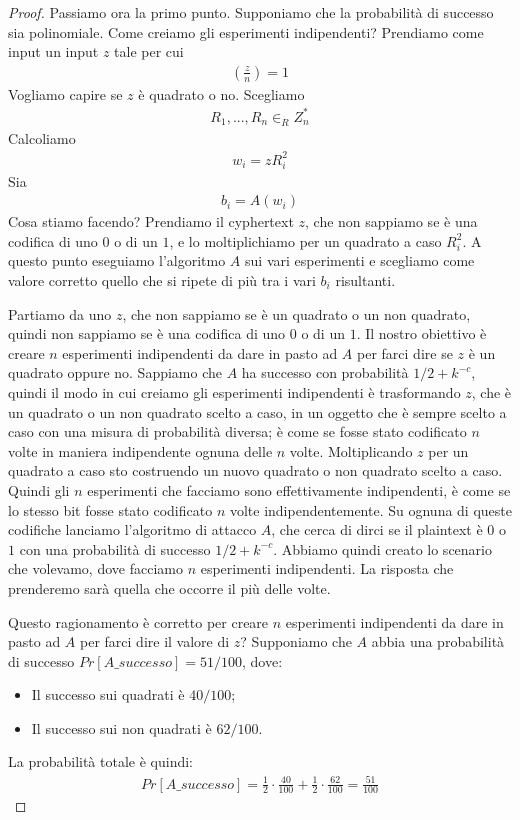 \begin{proof}
\noindent Passiamo ora la primo punto. Supponiamo che la probabilità di successo sia polinomiale. Come creiamo gli esperimenti indipendenti? Prendiamo come input un input $z$ tale per cui
\begin{align*}
    \left( \frac{z}{n}\right) = 1
\end{align*}
\noindent Vogliamo capire se $z$ è quadrato o no. Scegliamo
\begin{align*}
    R_1, ..., R_n \in_R Z_n^*
\end{align*}
\noindent Calcoliamo 
\begin{align*}
    w_i = zR_i^2
\end{align*}
\noindent Sia
\begin{align*}
    b_i = A(w_i)
\end{align*}
\noindent Cosa stiamo facendo? Prendiamo il cyphertext $z$, che non sappiamo se è una codifica di uno $0$ o di un $1$, e lo moltiplichiamo per un quadrato a caso $R_i^2$. A questo punto eseguiamo l'algoritmo $A$ sui vari esperimenti e scegliamo come valore corretto quello che si ripete di più tra i vari $b_i$ risultanti.

Partiamo da uno $z$, che non sappiamo se è un quadrato o un non quadrato, quindi non sappiamo se è una codifica di uno $0$ o di un $1$. Il nostro obiettivo è creare $n$ esperimenti indipendenti da dare in pasto ad $A$ per farci dire se $z$ è un quadrato oppure no. Sappiamo che $A$ ha successo con probabilità $1/2 + k^{-c}$, quindi il modo in cui creiamo gli esperimenti indipendenti è trasformando $z$, che è un quadrato o un non quadrato scelto a caso, in un oggetto che è sempre scelto a caso con una misura di probabilità diversa; è come se fosse stato codificato $n$ volte in maniera indipendente ognuna delle $n$ volte. Moltiplicando $z$ per un quadrato a caso sto costruendo un nuovo quadrato o non quadrato scelto a caso. Quindi gli $n$ esperimenti che facciamo sono effettivamente indipendenti, è come se lo stesso bit fosse stato codificato $n$ volte indipendentemente. Su ognuna di queste codifiche lanciamo l'algoritmo di attacco $A$, che cerca di dirci se il plaintext è $0$ o $1$ con una probabilità di successo $1/2 + k^{-c}$. Abbiamo quindi creato lo scenario che volevamo, dove facciamo $n$ esperimenti indipendenti. La risposta che prenderemo sarà quella che occorre il più delle volte. 

Questo ragionamento è corretto per creare $n$ esperimenti indipendenti da dare in pasto ad $A$ per farci dire il valore di $z$? 
Supponiamo che $A$ abbia una probabilità di successo $Pr[A\_successo] = 51/100$, dove:
\begin{itemize}
    \item Il successo sui quadrati è $40/100$;
    \item Il successo sui non quadrati è $62/100$.
\end{itemize}
\noindent La probabilità totale è quindi:
\begin{align*}
    Pr[A\_successo] = \frac{1}{2} \cdot \frac{40}{100} + \frac{1}{2} \cdot \frac{62}{100} = \frac{51}{100}
\end{align*}


\end{proof}
